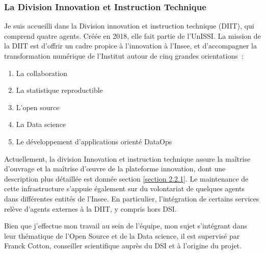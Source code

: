 \subsubsection{La Division Innovation et Instruction Technique}
Je suis accueilli dans la Division innovation et instruction technique (DIIT), qui comprend quatre agents. Créée en 2018, elle fait partie de l'UnISSI. La mission de la DIIT est d'offrir un cadre propice à l'innovation à l'Insee, et d'accompagner la transformation numérique de l'Institut autour de cinq grandes orientations~:
\begin{enumerate}
    \item La collaboration
    \item La statistique reproductible
    \item L'open source 
    \item La Data science
    \item Le développement d'applications orienté DataOps
    \newline
\end{enumerate}

Actuellement, la division Innovation et instruction technique assure la maîtrise d’ouvrage et la maîtrise d’œuvre de la plateforme innovation, dont une description plus détaillée est donnée section \ref{section 2.2.1}. Le maintenance de cette infrastructure s’appuie également sur du volontariat de quelques agents dans différentes entités de l’Insee. En particulier, l’intégration de certains services relève d’agents externes à la DIIT, y compris hors DSI. 
\newline

Bien que j'effectue mon travail au sein de l'équipe, mon sujet s'intégrant dans leur thématique de l'Open Source et de la Data science, il est supervisé par Franck Cotton, conseiller scientifique auprès du DSI et à l'origine du projet. 
\newline

